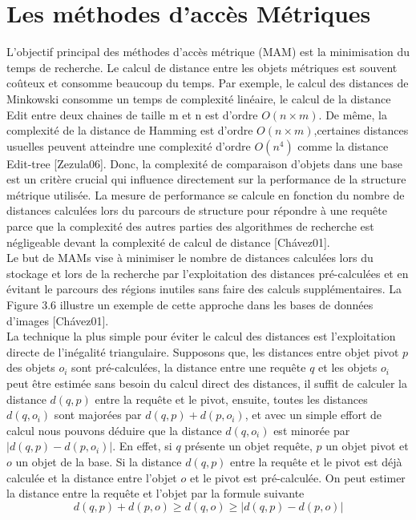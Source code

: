 \section{Les méthodes d’accès Métriques}
L'objectif principal des méthodes d’accès métrique (MAM) est la minimisation du temps de recherche. Le calcul de distance entre les objets métriques est souvent coûteux et consomme beaucoup du temps. Par exemple, le calcul des distances de Minkowski consomme un temps de complexité linéaire, le calcul de la distance Edit entre deux chaines de taille m et n est d’ordre $ O(n\times m) $. De même, la complexité de la distance de Hamming est d’ordre $ O(n\times m) $,certaines distances usuelles peuvent atteindre une complexité d’ordre $ O(n^4)  $ comme la distance Edit-tree [Zezula06]. Donc, la complexité de comparaison d’objets dans une base est un critère crucial qui influence directement sur la performance de la structure métrique utilisée. La mesure de performance se calcule en fonction du nombre de distances calculées lors du parcours de structure pour répondre à une requête parce que la complexité des autres parties des algorithmes de recherche est négligeable devant la complexité de calcul de distance [Chávez01].\\

Le but de MAMs vise à minimiser le nombre de distances calculées lors du stockage et lors de la recherche par l’exploitation des distances pré-calculées et en évitant le parcours des régions inutiles sans faire des calculs supplémentaires. La Figure 3.6 illustre un exemple de cette approche dans les bases de données d’images [Chávez01].\\


La technique la plus simple pour éviter le calcul des distances est l’exploitation directe de l’inégalité triangulaire. Supposons que, les distances entre objet pivot $ p $ des objets $ o_i $ sont pré-calculées, la distance entre une requête $ q $ et les objets $ o_i $ peut être estimée sans besoin du calcul direct des distances, il suffit de calculer la distance $ d(q,p) $ entre la requête et le pivot, ensuite, toutes les distances $ d(q,o_i) $ sont majorées par $ d(q,p)+d(p,o_i) $, et avec un simple effort de calcul nous pouvons déduire que la distance $ d(q,o_i) $ est minorée par $ |d(q,p)-d(p,o_i)| $. En effet, si $ q $ présente un objet requête, $ p $ un objet pivot et $ o $ un objet de la base. Si la distance $ d(q,p) $ entre la requête et le pivot est déjà calculée et la distance entre l’objet $ o $ et le pivot est pré-calculée. On peut estimer la distance entre la requête et l’objet par la formule suivante 
\begin{equation}
    d(q,p)+d(p,o) \geq d(q,o) \geq |d(q,p)-d(p,o)|
\end{equation}

